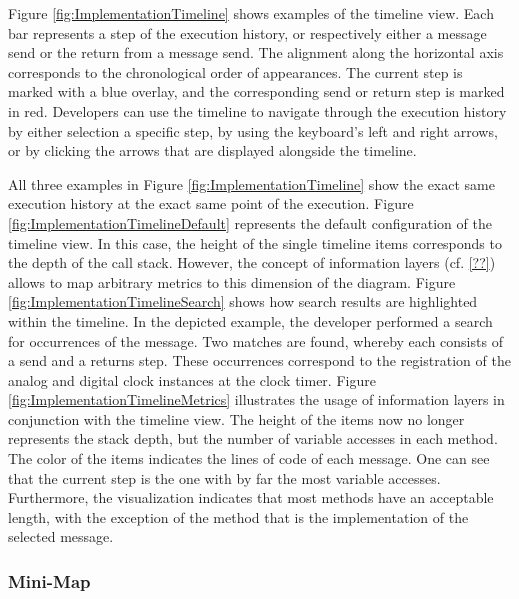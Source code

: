 Figure \ref{fig:ImplementationTimeline} shows examples of the timeline view.
Each bar represents a step of the execution history, or respectively either a message send or the return from a message send.
The alignment along the horizontal axis corresponds to the chronological order of appearances.
The current step is marked with a blue overlay, and the corresponding send or return step is marked in red.
Developers can use the timeline to navigate through the execution history by either selection a specific step, by using the keyboard's left and right arrows, or by clicking the arrows that are displayed alongside the timeline.

All three examples in Figure \ref{fig:ImplementationTimeline} show the exact same execution history at the exact same point of the execution.
Figure \ref{fig:ImplementationTimelineDefault} represents the default configuration of the timeline view.
In this case, the height of the single timeline items corresponds to the depth of the call stack.
However, the concept of information layers (cf. \ref{??}) allows to map arbitrary metrics to this dimension of the diagram.
Figure \ref{fig:ImplementationTimelineSearch} shows how search results are highlighted within the timeline.
In the depicted example, the developer performed a search for occurrences of the  message.
Two matches are found, whereby each consists of a send and a returns step.
These occurrences correspond to the registration of the analog and digital clock instances at the clock timer.
Figure \ref{fig:ImplementationTimelineMetrics} illustrates the usage of information layers in conjunction with the timeline view.
The height of the items now no longer represents the stack depth, but the number of variable accesses in each method.
The color of the items indicates the lines of code of each message.
One can see that the current step is the one with by far the most variable accesses.
Furthermore, the visualization indicates that most methods have an acceptable length, with the exception of the method that is the implementation of the selected message.

\subsubsection{Mini-Map}


